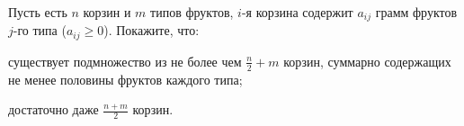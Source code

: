 Пусть есть $n$ корзин и $m$ типов фруктов, $i$-я корзина содержит $a_{ij}$ грамм фруктов $j$-го типа
($a_{ij} \ge 0$). Покажите, что:
\begin{enumcyr}
    \item существует подмножество из не более чем $\frac{n}{2} + m$ корзин, суммарно содержащих не менее
        половины фруктов каждого типа;
    \item достаточно даже $\frac{n + m}{2}$ корзин.
\end{enumcyr}

